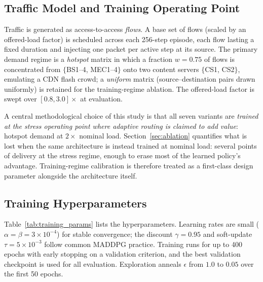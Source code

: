 \documentclass[10pt,journal,comsoc]{IEEEtran}
\begin{document}
\subsection{Traffic Model and Training Operating Point}
\label{subsec:traffic}
Traffic is generated as access-to-access \emph{flows}. A base set of flows (scaled by an offered-load factor) is scheduled across each 256-step episode, each flow lasting a fixed duration and injecting one packet per active step at its source. The primary demand regime is a \emph{hotspot} matrix in which a fraction $w=0.75$ of flows is concentrated from $\{$BS1--4, MEC1--4$\}$ onto two content servers $\{$CS1, CS2$\}$, emulating a CDN flash crowd; a \emph{uniform} matrix (source--destination pairs drawn uniformly) is retained for the training-regime ablation. The offered-load factor is swept over $[0.8, 3.0]\times$ at evaluation.

A central methodological choice of this study is that all seven variants are \emph{trained at the stress operating point where adaptive routing is claimed to add value}: hotspot demand at $2\times$ nominal load. Section~\ref{sec:ablation} quantifies what is lost when the same architecture is instead trained at nominal load: several points of delivery at the stress regime, enough to erase most of the learned policy's advantage. Training-regime calibration is therefore treated as a first-class design parameter alongside the architecture itself.

\subsection{Training Hyperparameters}
Table~\ref{tab:training_params} lists the hyperparameters. Learning rates are small ($\alpha=\beta=3\times10^{-4}$) for stable convergence; the discount $\gamma=0.95$ and soft-update $\tau=5\times10^{-3}$ follow common MADDPG practice. Training runs for up to 400 epochs with early stopping on a validation criterion, and the best validation checkpoint is used for all evaluation. Exploration anneals $\epsilon$ from $1.0$ to $0.05$ over the first 50 epochs.
\end{document}
